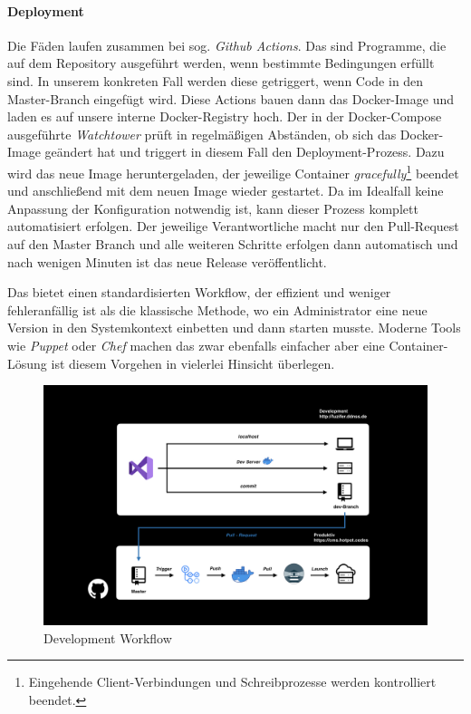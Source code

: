 \documentclass[titlepage, a4paper, 11pt]{scrartcl}
\begin{document}
        \paragraph{Deployment}        

          Die Fäden laufen zusammen bei sog. \textit{Github Actions}. Das sind Programme, die auf dem Repository ausgeführt werden, wenn bestimmte Bedingungen erfüllt sind.
          In unserem konkreten Fall werden diese getriggert, wenn Code in den Master-Branch eingefügt wird. Diese Actions bauen dann das Docker-Image und laden es auf unsere interne
          Docker-Registry hoch. Der in der Docker-Compose ausgeführte \textit{Watchtower} prüft in regelmäßigen Abständen, ob sich das Docker-Image geändert hat und triggert in diesem Fall
          den Deployment-Prozess. Dazu wird das neue Image heruntergeladen, der jeweilige Container \textit{gracefully}\footnote{Eingehende Client-Verbindungen und Schreibprozesse werden kontrolliert beendet.} 
          beendet und anschließend mit dem neuen Image wieder gestartet. Da im Idealfall keine Anpassung der Konfiguration notwendig ist, kann dieser Prozess komplett automatisiert erfolgen.
          Der jeweilige Verantwortliche macht nur den Pull-Request auf den Master Branch und alle weiteren Schritte erfolgen dann automatisch und nach wenigen Minuten ist das neue Release veröffentlicht.

          Das bietet einen standardisierten Workflow, der effizient und weniger fehleranfällig ist als die klassische Methode, wo ein Administrator eine neue Version in den Systemkontext einbetten und
          dann starten musste. Moderne Tools wie \textit{Puppet} oder \textit{Chef} machen das zwar ebenfalls einfacher aber eine Container-Lösung ist diesem Vorgehen in vielerlei Hinsicht überlegen.

          \begin{figure}[H]
            \centering
            \includegraphics[width=.8\textwidth]{pipeline.png}
            \caption{Development Workflow}
            \label{pipeline}
          \end{figure}
\end{document}
